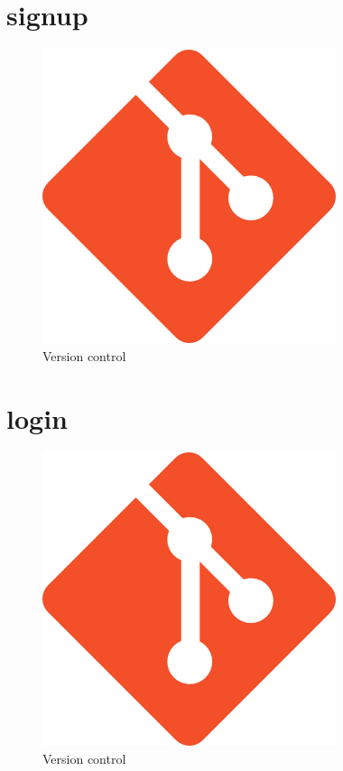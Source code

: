 \documentclass{article}
\begin{document}
\section{signup}
\begin{figure}[ht]
    \centering
    \includegraphics[width=.5\linewidth]{git_logo}
    \caption{Version control}
    \label{fig:sub1}
    \end{figure}

\cleardoublepage













\section{login}
\begin{figure}[ht]
    \centering
    \includegraphics[width=.5\linewidth]{git_logo}
    \caption{Version control}
    \label{fig:sub1}
    \end{figure}

\cleardoublepage
\end{document}
